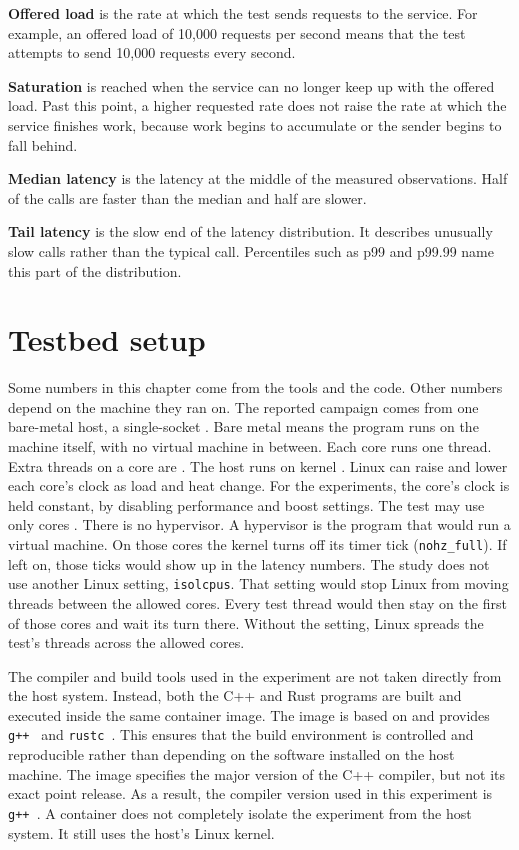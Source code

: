 \documentclass[english,oneside,a4paper,censored,csm,software-track-2020]{HYthesisML}
\begin{document}
\textbf{Offered load} is the rate at which the test sends requests to the
service. For example, an offered load of 10{,}000 requests per second means
that the test attempts to send 10{,}000 requests every second.

\textbf{Saturation} is reached when the service can no longer keep up with the
offered load. Past this point, a higher requested rate does not raise the rate
at which the service finishes work, because work begins to accumulate or the
sender begins to fall behind.

\textbf{Median latency} is the latency at the middle of the measured
observations. Half of the calls are faster than the median and half are slower.

\textbf{Tail latency} is the slow end of the latency distribution. It
describes unusually slow calls rather than the typical call. Percentiles such
as p99 and p99.99 name this part of the distribution.

\section{Testbed setup\label{sec:testbed}}
Some numbers in this chapter come from the tools and the code. Other
numbers depend on the machine they ran on. The reported campaign comes from
one bare-metal host, a single-socket \MainCpu{}. Bare metal means the program runs on the machine itself,
with no virtual machine in between. Each core runs one
thread. Extra threads on a core are \MainSmt{}. The host runs
\MainHostDistro{} on kernel \MainKernel{}. Linux can raise and
lower each core's clock as load and heat change. For the experiments, the core's clock is held
constant, by disabling performance and boost settings. The
test may use only cores \MainPinned{}. There is no hypervisor. A hypervisor
is the program that would run a virtual machine. On those
cores the kernel turns off its timer tick (\texttt{nohz\_full}).
If left on, those ticks would show up in the latency numbers. The study does not use another Linux setting, \texttt{isolcpus}. That setting
would stop Linux from moving threads between the allowed cores. Every test
thread would then stay on the first of those cores and wait its turn there.
Without the setting, Linux spreads the test's threads across the allowed cores.

The compiler and build tools used in the experiment are not taken directly
from the host system. Instead, both the C++ and Rust programs are built and
executed inside the same container image. The image is based on \MainDistro{}
and provides \texttt{g++~\MainGpp} and \texttt{rustc~\MainRustc}. This
ensures that the build environment is controlled and reproducible rather
than depending on the software installed on the host machine. The image specifies the major
version of the C++ compiler, but not its exact point release. As a
result, the compiler version used in this experiment is \texttt{g++~\MainGpp}. A container
does not completely isolate the experiment from the host system. It still uses the host's
Linux kernel.
\end{document}
